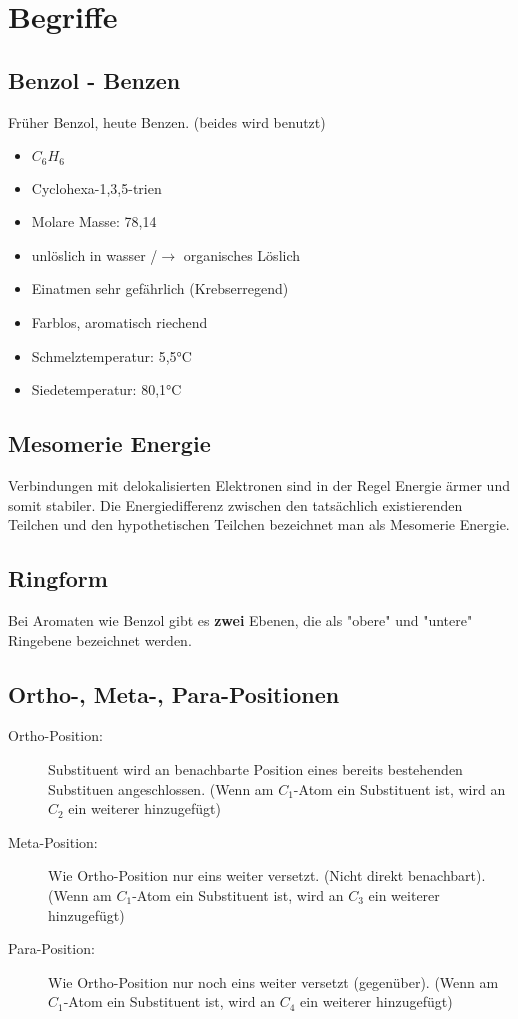 \section{Begriffe}

\subsection{Benzol - Benzen}
Früher Benzol, heute Benzen. (beides wird benutzt)
\begin{multicols}{2}
\begin{itemize}
    \item $C_6H_6$
    \item Cyclohexa-1,3,5-trien
    \item Molare Masse: 78,14
    \item unlöslich in wasser /$\rightarrow$ organisches Löslich
    \item Einatmen sehr gefährlich (Krebserregend)
    \item Farblos, aromatisch riechend
    \item Schmelztemperatur: 5,5°C
    \item Siedetemperatur: 80,1°C
\end{itemize}
\end{multicols}


\subsection{Mesomerie Energie} \label{sec:mesomerie}
Verbindungen mit delokalisierten Elektronen sind in der 
Regel Energie ärmer und somit stabiler. 
Die Energiedifferenz zwischen den tatsächlich existierenden 
Teilchen und den hypothetischen Teilchen bezeichnet man als 
Mesomerie Energie.


\subsection{Ringform}
Bei Aromaten wie Benzol gibt es \textbf{zwei} Ebenen, die als "obere" und "untere" Ringebene bezeichnet werden. 


\subsection{Ortho-, Meta-, Para-Positionen}
\begin{description}
    \item[Ortho-Position:] Substituent wird an benachbarte Position eines bereits bestehenden Substituen angeschlossen. (Wenn am $C_1$-Atom ein Substituent ist, wird an $C_2$ ein weiterer hinzugefügt)
    \item[Meta-Position:] Wie Ortho-Position nur eins weiter versetzt. (Nicht direkt benachbart). (Wenn am $C_1$-Atom ein Substituent ist, wird an $C_3$ ein weiterer hinzugefügt)
    \item[Para-Position:] Wie Ortho-Position nur noch eins weiter versetzt (gegenüber). (Wenn am $C_1$-Atom ein Substituent ist, wird an $C_4$ ein weiterer hinzugefügt)
\end{description}


